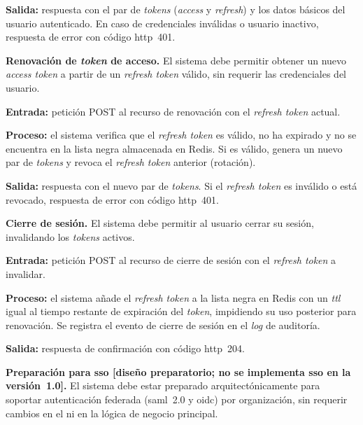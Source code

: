 \begin{functional}
    \textbf{Salida:} respuesta con el par de \textit{tokens} (\textit{access} y
    \textit{refresh}) y los datos básicos del usuario autenticado. En caso de credenciales
    inválidas o usuario inactivo, respuesta de error con código \acs{http}~401.

    \item \textbf{Renovación de \textit{token} de acceso.} \label{rf:auth:refresh}
    El sistema debe permitir obtener un nuevo \textit{access token} a partir de un
    \textit{refresh token} válido, sin requerir las credenciales del usuario.

    \textbf{Entrada:} petición POST al recurso de renovación con el \textit{refresh token}
    actual.

    \textbf{Proceso:} el sistema verifica que el \textit{refresh token} es válido, no ha
    expirado y no se encuentra en la lista negra almacenada en Redis. Si es válido, genera
    un nuevo par de \textit{tokens} y revoca el \textit{refresh token} anterior (rotación).

    \textbf{Salida:} respuesta con el nuevo par de \textit{tokens}. Si el \textit{refresh
    token} es inválido o está revocado, respuesta de error con código \acs{http}~401.

    \item \textbf{Cierre de sesión.} \label{rf:auth:logout}
    El sistema debe permitir al usuario cerrar su sesión, invalidando los \textit{tokens}
    activos.

    \textbf{Entrada:} petición POST al recurso de cierre de sesión con el \textit{refresh
    token} a invalidar.

    \textbf{Proceso:} el sistema añade el \textit{refresh token} a la lista negra en
    Redis con un \textit{ttl} igual al tiempo restante de expiración del \textit{token},
    impidiendo su uso posterior para renovación. Se registra el evento de cierre de sesión
    en el \textit{log} de auditoría.

    \textbf{Salida:} respuesta de confirmación con código \acs{http}~204.

    \item \textbf{Preparación para \acl{sso} 
    \textnormal{[diseño preparatorio; no se implementa  \acs{sso} en la
    versión~1.0]}.} \label{rf:auth:sso}
    El sistema debe estar preparado arquitectónicamente para soportar autenticación
    federada (\acs{saml}~2.0 y \acs{oidc}) por organización, sin requerir cambios en el
     ni en la lógica de negocio principal.


\end{functional}
